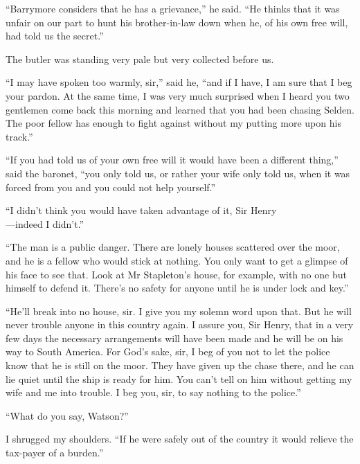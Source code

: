 \documentclass[paper=a5,BCOR=7mm,twoside,DIV=calc,12pt,usegeometry,openany,chapterprefix,endperiod,headings=big]{scrbook} %
\begin{document}
\enquote{Barrymore considers that he has a grievance,} he said. \enquote{He thinks that it was unfair on our part to hunt his brother-in-law down when he, of his own free will, had told us the secret.}

The butler was standing very pale but very collected before us.


\enquote{I may have spoken too warmly, sir,} said he, \enquote{and if I have, I am sure that I beg your pardon. At the same time, I was very much surprised when I heard you two gentlemen come back this morning and learned that you had been chasing Selden. The poor fellow has enough to fight against without my putting more upon his track.}

\enquote{If you had told us of your own free will it would have been a different thing,} said the baronet, \enquote{you only told us, or rather your wife only told us, when it was forced from you and you could not help yourself.}

\enquote{I didn't think you would have taken advantage of it, Sir Henry\\ ---indeed I didn't.}

\enquote{The man is a public danger. There are lonely houses scattered over the moor, and he is a fellow who would stick at nothing. You only want to get a glimpse of his face to see that. Look at Mr Stapleton's house, for example, with no one but himself to defend it. There's no safety for anyone until he is under lock and key.}

\enquote{He'll break into no house, sir. I give you my solemn word upon that. But he will never trouble anyone in this country again. I assure you, Sir Henry, that in a very few days the necessary arrangements will have been made and he will be on his way to South America. For God's sake, sir, I beg of you not to let the police know that he is still on the moor. They have given up the chase there, and he can lie quiet until the ship is ready for him. You can't tell on him without getting my wife and me into trouble. I beg you, sir, to say nothing to the police.}

\enquote{What do you say, Watson?}

I shrugged my shoulders. \enquote{If he were safely out of the country it would relieve the tax-payer of a burden.}
\end{document}

